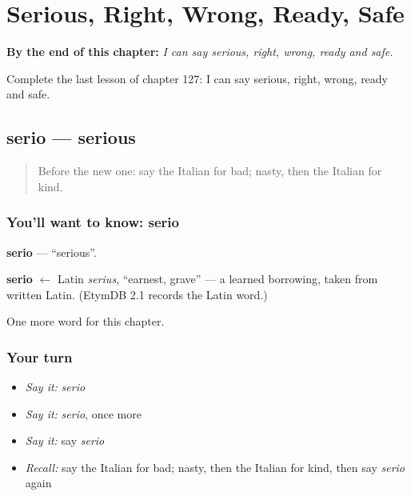 
\chapter{Serious, Right, Wrong, Ready, Safe}
\label{ch:it-serious-right-wrong-ready-safe}

\begin{chapteropening}
\textbf{By the end of this chapter:} \emph{I can say serious, right, wrong, ready and safe.}

Complete the last lesson of chapter 127: I can say serious, right, wrong, ready and safe.
\end{chapteropening}

\section[serio]{serio — serious}

\label{lesson:IT-C127-serio}



\begin{quote}
Before the new one: say the Italian for bad; nasty, then the Italian for kind.
\end{quote}

\subsection*{You'll want to know: serio}
\textbf{serio} — \textquotedblleft{}serious\textquotedblright{}.

\begin{cousinweb}
\textbf{serio} $\leftarrow$ Latin \emph{serius}, \textquotedblleft{}earnest, grave\textquotedblright{} — a learned borrowing, taken from written Latin. (EtymDB 2.1 records the Latin word.)
\end{cousinweb}

\begin{grammarlens}[title={What you've built}]
One more word for this chapter.
\end{grammarlens}

\subsection*{Your turn}
\begin{itemize}
\raggedright
  \item \emph{Say it:} \emph{serio}
  \item \emph{Say it:} \emph{serio}, once more
  \item \emph{Say it:} say \emph{serio}
  \item \emph{Recall:} say the Italian for bad; nasty, then the Italian for kind, then say \emph{serio} again
\end{itemize}

